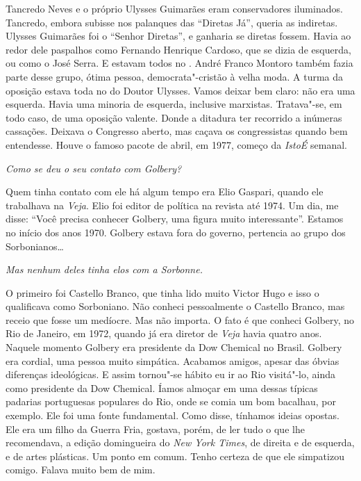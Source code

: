 \normalfont
Tancredo Neves e o próprio Ulysses Guimarães eram
conservadores iluminados. Tancredo, embora subisse nos palanques das
``Diretas Já'', queria as indiretas. Ulysses Guimarães foi o ``Senhor
Diretas'', e ganharia se diretas fossem. Havia ao redor dele paspalhos
como Fernando Henrique Cardoso, que se dizia de esquerda, ou como o José
Serra. E estavam todos no . André Franco Montoro também fazia parte
desse grupo, ótima pessoa, democrata"-cristão à velha moda. A turma da
oposição estava toda no  do Doutor Ulysses. Vamos deixar bem claro:
não era uma esquerda. Havia uma minoria de esquerda, inclusive
marxistas. Tratava"-se, em todo caso, de uma oposição valente. Donde a
ditadura ter recorrido a inúmeras cassações. Deixava o Congresso aberto,
mas caçava os congressistas quando bem entendesse. Houve o famoso pacote
de abril, em 1977, começo da \emph{IstoÉ} semanal.

\itshape
 Como se deu o seu contato com Golbery?

\normalfont
Quem tinha contato com ele há algum tempo era Elio
Gaspari, quando ele trabalhava na \emph{Veja}. Elio foi editor de
política na revista até 1974. Um dia, me disse: ``Você precisa conhecer
Golbery, uma figura muito interessante''. Estamos no início dos anos
1970. Golbery estava fora do governo, pertencia ao grupo dos
Sorbonianos…

\itshape
 Mas nenhum deles tinha elos com a Sorbonne.

\normalfont
O primeiro foi Castello Branco, que tinha lido muito
Victor Hugo e isso o qualificava como Sorboniano. Não conheci
pessoalmente o Castello Branco, mas receio que fosse um medíocre. Mas
não importa. O fato é que conheci Golbery, no Rio de Janeiro, em 1972,
quando já era diretor de \emph{Veja} havia quatro anos. Naquele momento
Golbery era presidente da Dow Chemical no Brasil. Golbery era cordial,
uma pessoa muito simpática. Acabamos amigos, apesar das óbvias
diferenças ideológicas. E assim tornou"-se hábito eu ir ao Rio visitá"-lo,
ainda como presidente da Dow Chemical. Íamos almoçar em uma dessas
típicas padarias portuguesas populares do Rio, onde se comia um bom
bacalhau, por exemplo. Ele foi uma fonte fundamental. Como disse,
tínhamos ideias opostas. Ele era um filho da Guerra Fria, gostava,
porém, de ler tudo o que lhe recomendava, a edição domingueira do
\emph{New York Times}, de direita e de esquerda, e de artes plásticas.
Um ponto em comum. Tenho certeza de que ele simpatizou comigo. Falava
muito bem de mim.

